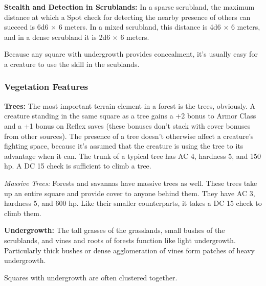 
\textbf{Stealth and Detection in Scrublands:} In a sparse scrubland, the maximum distance at which a Spot check for detecting the nearby presence of others can succeed is 6d6 $\times$ 6 meters. In a mixed scrubland, this distance is 4d6 $\times$ 6 meters, and in a dense scrubland it is 2d6 $\times$ 6 meters.

Because any square with undergrowth provides concealment, it's usually easy for a creature to use the  skill in the scublands.


\subsubsection{Vegetation Features}
\textbf{Trees:} The most important terrain element in a forest is the trees, obviously. A creature standing in the same square as a tree gains a +2 bonus to Armor Class and a +1 bonus on Reflex saves (these bonuses don't stack with cover bonuses from other sources). The presence of a tree doesn't otherwise affect a creature's fighting space, because it's assumed that the creature is using the tree to its advantage when it can. The trunk of a typical tree has AC 4, hardness 5, and 150 hp. A DC 15  check is sufficient to climb a tree.

\textit{Massive Trees:} Forests and savannas have massive trees as well. These trees take up an entire square and provide cover to anyone behind them. They have AC 3, hardness 5, and 600 hp. Like their smaller counterparts, it takes a DC 15  check to climb them.


\textbf{Undergrowth:} The tall grasses of the grasslands, small bushes of the scrublands, and vines and roots of forests function like light undergrowth. Particularly thick bushes or dense agglomeration of vines form patches of heavy undergrowth.

Squares with undergrowth are often clustered together. %

